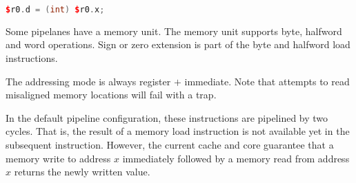 \begin{lstlisting}[numbers=none, basicstyle=\ttfamily\footnotesize, language=C++]
$r0.d = (int) $r0.x;
\end{lstlisting}

Some \rvex{} pipelanes have a memory unit. The memory unit supports byte,
halfword and word operations. Sign or zero extension is part of the byte and
halfword load instructions.

The addressing mode is always register $+$ immediate. Note that attempts to read
misaligned memory locations will fail with a  trap.

In the default pipeline configuration, these instructions are pipelined by
two cycles. That is, the result of a memory load instruction is not available
yet in the subsequent instruction. However, the current cache and core guarantee
that a memory write to address $x$ immediately followed by a memory read from
address $x$ returns the newly written value.
\vskip 10pt
